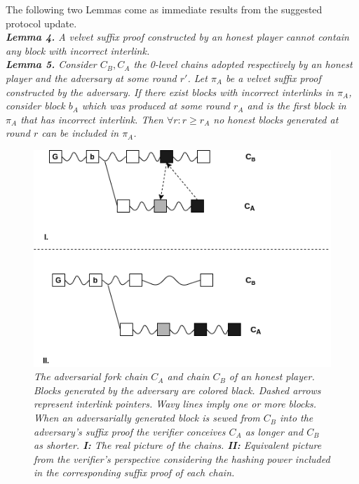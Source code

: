 The following two Lemmas come as immediate results from the suggested protocol update.\\

\textit{\textbf{Lemma 4.} A velvet suffix proof constructed by an honest player cannot contain any block with incorrect interlink.}\\

\textit{\textbf{Lemma 5.} Consider $C_B, C_A$ the 0-level chains adopted respectively by an honest player and the adversary at some round $r'$. Let $\pi_A$ be a velvet suffix proof constructed by the adversary. If there exist blocks with incorrect interlinks in $\pi_A$, consider block $b_A$ which was produced at some round $r_A$ and is the first block in $\pi_A$ that has incorrect interlink. Then $\forall r: r \geq r_A$ no honest blocks generated at round $r$ can be included in $\pi_A$.} \\

\begin{figure}[h!]
	\begin{center}
		\includegraphics[scale=0.5]{figures/injection.png}
	\end{center}
	\caption{\textit{The adversarial fork chain $C_A$ and chain $C_B$ of an honest player. Blocks generated by the adversary are colored black. Dashed arrows represent interlink pointers. Wavy lines imply one or more blocks. When an adversarially generated block is sewed from $C_B$ into the adversary's suffix proof the verifier conceives $C_A$ as longer and $C_B$ as shorter.  \textbf{I:} The real picture
	 of the chains. \textbf{II:} Equivalent picture from the verifier's perspective considering the hashing power included in the corresponding suffix proof of each chain.}}
	\label{fig:injection}
\end{figure}

